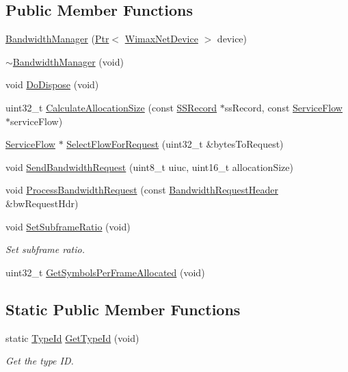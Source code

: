 \subsection*{Public Member Functions}
\begin{DoxyCompactItemize}
\item 
\hyperlink{classns3_1_1BandwidthManager_a8e3c71fe101cbac029c780c1e81e5c4f}{Bandwidth\+Manager} (\hyperlink{classns3_1_1Ptr}{Ptr}$<$ \hyperlink{classns3_1_1WimaxNetDevice}{Wimax\+Net\+Device} $>$ device)
\item 
\hyperlink{classns3_1_1BandwidthManager_aa45d4a864547427e916c5ecbe34d2989}{$\sim$\+Bandwidth\+Manager} (void)
\item 
void \hyperlink{classns3_1_1BandwidthManager_a0743fe984259718af12a5cd98e3b8c4a}{Do\+Dispose} (void)
\item 
uint32\+\_\+t \hyperlink{classns3_1_1BandwidthManager_a60dbf098a04a926224fe4ac331e1e99c}{Calculate\+Allocation\+Size} (const \hyperlink{classns3_1_1SSRecord}{S\+S\+Record} $\ast$ss\+Record, const \hyperlink{classns3_1_1ServiceFlow}{Service\+Flow} $\ast$service\+Flow)
\item 
\hyperlink{classns3_1_1ServiceFlow}{Service\+Flow} $\ast$ \hyperlink{classns3_1_1BandwidthManager_a6ca1dc2064996be0c67fdd6697be9654}{Select\+Flow\+For\+Request} (uint32\+\_\+t \&bytes\+To\+Request)
\item 
void \hyperlink{classns3_1_1BandwidthManager_acbe780c5080f4001b2a1a117f446dd74}{Send\+Bandwidth\+Request} (uint8\+\_\+t uiuc, uint16\+\_\+t allocation\+Size)
\item 
void \hyperlink{classns3_1_1BandwidthManager_aa9e0e7e0c12acb2bac6076dc2520f134}{Process\+Bandwidth\+Request} (const \hyperlink{classns3_1_1BandwidthRequestHeader}{Bandwidth\+Request\+Header} \&bw\+Request\+Hdr)
\item 
void \hyperlink{classns3_1_1BandwidthManager_a2347150df25b7d6497947d5b755b6dd9}{Set\+Subframe\+Ratio} (void)
\begin{DoxyCompactList}\small\item\em Set subframe ratio. \end{DoxyCompactList}\item 
uint32\+\_\+t \hyperlink{classns3_1_1BandwidthManager_a8176b51c99d998010eed72d1bee7782d}{Get\+Symbols\+Per\+Frame\+Allocated} (void)
\end{DoxyCompactItemize}
\subsection*{Static Public Member Functions}
\begin{DoxyCompactItemize}
\item 
static \hyperlink{classns3_1_1TypeId}{Type\+Id} \hyperlink{classns3_1_1BandwidthManager_af2ab4110e0cbbd912bbb284353146871}{Get\+Type\+Id} (void)
\begin{DoxyCompactList}\small\item\em Get the type ID. \end{DoxyCompactList}\end{DoxyCompactItemize}
